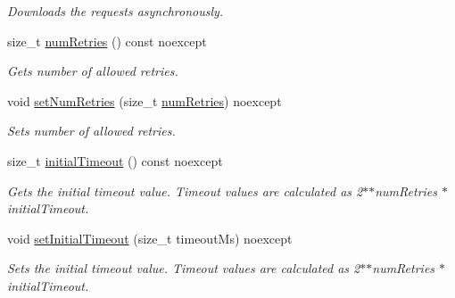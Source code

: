 \begin{DoxyCompactItemize}
\begin{DoxyCompactList}\small\item\em Downloads the requests asynchronously. \end{DoxyCompactList}\item 
size\+\_\+t \hyperlink{classdg_1_1deepcore_1_1network_1_1_http_downloader_adabfaf68384e694a042bd4418976f885}{num\+Retries} () const noexcept
\begin{DoxyCompactList}\small\item\em Gets number of allowed retries. \end{DoxyCompactList}\item 
void \hyperlink{classdg_1_1deepcore_1_1network_1_1_http_downloader_a816ab62855840ce30fbd7deadeb78ae9}{set\+Num\+Retries} (size\+\_\+t \hyperlink{classdg_1_1deepcore_1_1network_1_1_http_downloader_adabfaf68384e694a042bd4418976f885}{num\+Retries}) noexcept
\begin{DoxyCompactList}\small\item\em Sets number of allowed retries. \end{DoxyCompactList}\item 
size\+\_\+t \hyperlink{classdg_1_1deepcore_1_1network_1_1_http_downloader_aec830e6e7d5634b3cfac883309ac7357}{initial\+Timeout} () const noexcept
\begin{DoxyCompactList}\small\item\em Gets the initial timeout value. Timeout values are calculated as 2$\ast$$\ast$num\+Retries $\ast$ initial\+Timeout. \end{DoxyCompactList}\item 
void \hyperlink{classdg_1_1deepcore_1_1network_1_1_http_downloader_a524baa482724f8c6230104a1d1dc302f}{set\+Initial\+Timeout} (size\+\_\+t timeout\+Ms) noexcept
\begin{DoxyCompactList}\small\item\em Sets the initial timeout value. Timeout values are calculated as 2$\ast$$\ast$num\+Retries $\ast$ initial\+Timeout. \end{DoxyCompactList}\end{DoxyCompactItemize}
